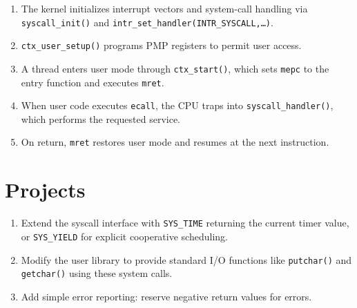 \begin{enumerate}
  \item The kernel initializes interrupt vectors and system-call handling via
        \texttt{syscall\_init()} and \texttt{intr\_set\_handler(INTR\_SYSCALL,\dots)}.
  \item \texttt{ctx\_user\_setup()} programs PMP registers to permit user access.
  \item A thread enters user mode through \texttt{ctx\_start()}, which sets
        \texttt{mepc} to the entry function and executes \texttt{mret}.
  \item When user code executes \texttt{ecall}, the CPU traps into
        \texttt{syscall\_handler()}, which performs the requested service.
  \item On return, \texttt{mret} restores user mode and resumes at the next
        instruction.
\end{enumerate}

\section*{Projects}

\begin{enumerate}
  \item Extend the syscall interface with \texttt{SYS\_TIME} returning the current
        timer value, or \texttt{SYS\_YIELD} for explicit cooperative scheduling.
  \item Modify the user library to provide standard I/O functions like
        \texttt{putchar()} and \texttt{getchar()} using these system calls.
  \item Add simple error reporting: reserve negative return values for errors.
\end{enumerate}
